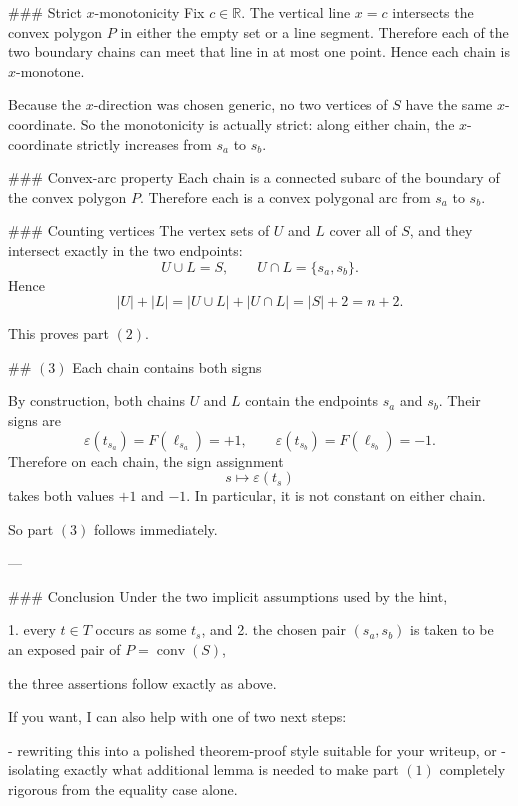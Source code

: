 ### Strict \(x\)-monotonicity
Fix \(c\in\mathbb{R}\). The vertical line \(x=c\) intersects the convex polygon \(P\) in either the empty set or a line segment. Therefore each of the two boundary chains can meet that line in at most one point. Hence each chain is \(x\)-monotone.

Because the \(x\)-direction was chosen generic, no two vertices of \(S\) have the same \(x\)-coordinate. So the monotonicity is actually strict: along either chain, the \(x\)-coordinate strictly increases from \(s_a\) to \(s_b\).

### Convex-arc property
Each chain is a connected subarc of the boundary of the convex polygon \(P\). Therefore each is a convex polygonal arc from \(s_a\) to \(s_b\).

### Counting vertices
The vertex sets of \(U\) and \(L\) cover all of \(S\), and they intersect exactly in the two endpoints:
\[
U\cup L=S,\qquad U\cap L=\{s_a,s_b\}.
\]
Hence
\[
|U|+|L|
=|U\cup L|+|U\cap L|
=|S|+2
=n+2.
\]

This proves part \( (2)\).

## \( (3)\) Each chain contains both signs

By construction, both chains \(U\) and \(L\) contain the endpoints \(s_a\) and \(s_b\). Their signs are
\[
\varepsilon(t_{s_a})=F(\ell_{s_a})=+1,\qquad
\varepsilon(t_{s_b})=F(\ell_{s_b})=-1.
\]
Therefore on each chain, the sign assignment
\[
s\longmapsto \varepsilon(t_s)
\]
takes both values \(+1\) and \(-1\). In particular, it is not constant on either chain.

So part \( (3)\) follows immediately.

---

### Conclusion
Under the two implicit assumptions used by the hint,

1. every \(t\in T\) occurs as some \(t_s\), and  
2. the chosen pair \((s_a,s_b)\) is taken to be an exposed pair of \(P=\operatorname{conv}(S)\),

the three assertions follow exactly as above.

If you want, I can also help with one of two next steps:

- rewriting this into a polished theorem-proof style suitable for your writeup, or
- isolating exactly what additional lemma is needed to make part \( (1)\) completely rigorous from the equality case alone.